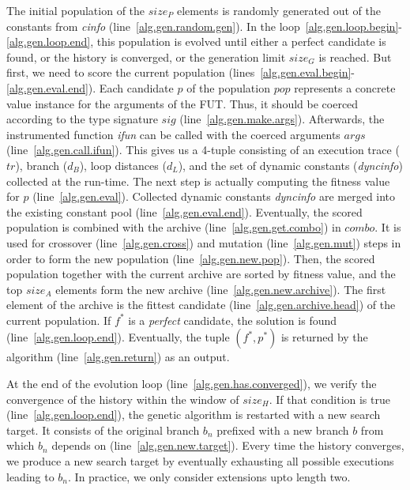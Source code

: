 The initial population of the $size_P$ elements is randomly generated out of the constants from \emph{cinfo} (line~\ref{alg.gen.random.gen}). In the loop~\ref{alg.gen.loop.begin}-\ref{alg.gen.loop.end}, this population is evolved until either a perfect candidate is found, or the history is converged, or the generation limit $size_G$ is reached. But first, we need to score the current population (lines~\ref{alg.gen.eval.begin}-\ref{alg.gen.eval.end}). Each candidate $p$ of the population $pop$ represents a concrete value instance for the arguments of the FUT. Thus, it should be coerced according to the type signature $sig$ (line~\ref{alg.gen.make.args}). Afterwards, the instrumented function \emph{ifun} can be called with the coerced arguments $args$ (line~\ref{alg.gen.call.ifun}). This gives us a 4-tuple consisting of an execution trace ($tr$), branch ($d_B$), loop distances ($d_L$), and the set of dynamic constants (\emph{dyncinfo}) collected at the run-time. The next step is actually computing the fitness value for $p$ (line~\ref{alg.gen.eval}). Collected dynamic constants \emph{dyncinfo} are merged into the existing constant pool (line~\ref{alg.gen.eval.end}). Eventually, the scored population is combined with the archive (line~\ref{alg.gen.get.combo}) in $combo$. It is used for crossover (line~\ref{alg.gen.cross}) and mutation (line~\ref{alg.gen.mut}) steps in order to form the new population (line~\ref{alg.gen.new.pop}). Then, the scored population together with the current archive are sorted by fitness value, and the top $size_A$ elements form the new archive (line~\ref{alg.gen.new.archive}). The first element of the archive is the fittest candidate (line~\ref{alg.gen.archive.head}) of the current population. If $f^*$ is a \emph{perfect} candidate, the solution is found (line~\ref{alg.gen.loop.end}). Eventually, the tuple $(f^*, p^*)$ is returned by the algorithm (line~\ref{alg.gen.return}) as an output.

At the end of the evolution loop (line~\ref{alg.gen.has.converged}), we verify the convergence of the history within the window of $size_H$. If that condition is true (line~\ref{alg.gen.loop.end}), the genetic algorithm is restarted with a new search target. It consists of the original branch $b_n$ prefixed with a new branch $b$ from which $b_n$ depends on (line~\ref{alg.gen.new.target}). Every time the history converges, we produce a new search target by eventually exhausting all possible executions leading to $b_n$. In practice, we only consider extensions upto length two.

